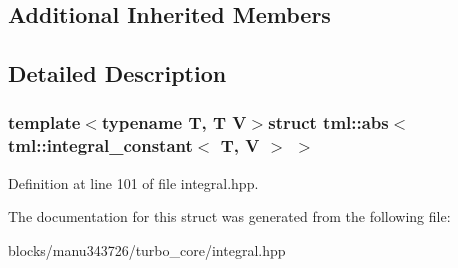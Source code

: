 \subsection*{Additional Inherited Members}


\subsection{Detailed Description}
\subsubsection*{template$<$typename T, T V$>$struct tml\+::abs$<$ tml\+::integral\+\_\+constant$<$ T, V $>$ $>$}



Definition at line 101 of file integral.\+hpp.



The documentation for this struct was generated from the following file\+:\begin{DoxyCompactItemize}
\item 
blocks/manu343726/turbo\+\_\+core/integral.\+hpp\end{DoxyCompactItemize}
